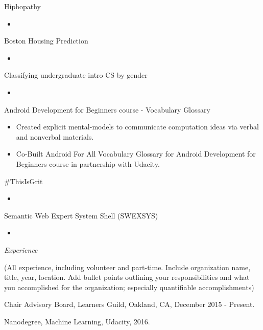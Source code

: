 \documentclass[11pt,article,oneside]{memoir}
\begin{document}
\ind Hiphopathy
\begin{itemize}
\item 
\end{itemize} 

\ind Boston Housing Prediction
\begin{itemize}
\item 
\end{itemize} 

\ind Classifying undergraduate intro CS by gender
\begin{itemize}
\item 
\end{itemize} 

\ind Android Development for Beginners course - Vocabulary Glossary
\begin{itemize}
\item Created explicit mental-models to communicate computation ideas via verbal and nonverbal materials.
\item Co-Built Android For All Vocabulary Glossary for Android Development for Beginners course in partnership with Udacity.
\end{itemize} 

\ind \#ThisIsGrit
\begin{itemize}
\item 
\end{itemize} 

\ind Semantic Web Expert System Shell (SWEXSYS)
\begin{itemize}
\item 
\end{itemize} 

\bigskip 

  
\medskip

\noindent\emph{Experience \vspace{0.05in}}

\ind (All experience, including volunteer and part-time. Include organization name, title, year, location. Add bullet points outlining your responsibilities and what you accomplished for the organization; especially quantifiable accomplishments)

\ind Chair Advisory Board, Learners Guild, Oakland, CA, December 2015 - Present.
\bigskip 



\ind Nanodegree, Machine Learning, Udacity, 2016.\vspace{0.05in}
\end{document}

